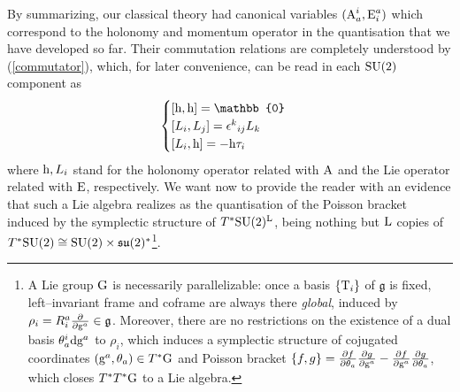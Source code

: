 By summarizing, our classical theory had canonical variables $(\text{\normalfont A}^i_a,\text{\normalfont E}^a_i)$ which correspond to the holonomy and momentum operator in the quantisation that we have developed so far. Their commutation relations are completely understood by (\ref{commutator}), which, for later convenience, can be read in each $\text{\normalfont SU}(2)$ component as
\begin{equation}\label{commutator_simple}
    \begin{cases}
        [\h,\h]=\mathbb{0}\\
        [L_i,L_j]={\epsilon^k}_{ij}L_k\\
        [L_i,\h]=-\h\tau_i
    \end{cases}
\end{equation}
where $\text{\normalfont h},L_i$ stand for the holonomy operator related with $\text{\normalfont A}$ and the Lie operator related with $\text{\normalfont E}$, respectively. We want now to provide the reader with an evidence that such a Lie algebra realizes as the quantisation of the Poisson bracket induced by the symplectic structure of $T^*\text{\normalfont SU}(2)^{\text{\normalfont L}}$, being nothing but $\text{\normalfont L}$ copies of $T^*\text{\normalfont SU}(2)\cong\text{\normalfont SU}(2)\times\mathfrak{su}(2)^*$\footnote{A Lie group $\text{\normalfont G}$ is necessarily parallelizable: once a basis $\{\text{\normalfont T}_i\}$ of $\mathfrak{g}$ is fixed, left--invariant frame and coframe are always there \emph{global}, induced by $\rho_i=R^a_i\frac{\partial}{\partial\text{\normalfont g}^a}\in\mathfrak{g}$. Moreover, there are no restrictions on the existence of a dual basis $\theta^i_a\text{\normalfont d}\text{\normalfont g}^a$ to $\rho_i$, which induces a symplectic structure of cojugated coordinates $(\text{\normalfont g}^a,\theta_a)\in T^*\text{\normalfont G}$ and Poisson bracket $\{f,g\}=\frac{\partial f}{\partial\theta_a}\frac{\partial g}{\partial{\tiny}\text{\normalfont g}^a}-\frac{\partial f}{\partial\tiny\text{\normalfont g}^a}\frac{\partial g}{\partial\theta_a}$, which closes $T^*T^*\text{\normalfont G}$ to a Lie algebra.}. 

